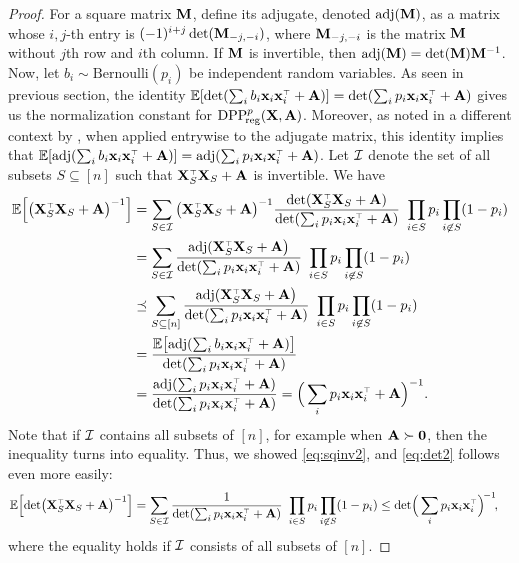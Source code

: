 \documentclass[thesis.tex]{subfiles}
\begin{document}
\begin{proof}
For a square matrix $\mathbf M$, define its adjugate, denoted $\operatorname{\textnormal{adj}}(\mathbf M)$, as a matrix
whose $i,j$-th entry is $(-1)^{i+j}\det(\mathbf M_{-j,-i})$, where
$\mathbf M_{-j,-i}$ is the matrix $\mathbf M$ without $j$th row and $i$th column. If
$\mathbf M$ is invertible, then $\operatorname{\textnormal{adj}}(\mathbf M) = \det(\mathbf M)\mathbf M^{-1}$. Now, let
$b_i\sim\mathrm{Bernoulli}(p_i)$ be independent random variables. As seen
in previous section, the identity
$\E[\det(\sum_ib_i\x_i\x_i^\top+\A)]=\det(\sum_ip_i\x_i\x_i^\top+\A)$ gives
us the normalization constant for ${{\mathrm{DPP}}_{\!\mathrm{reg}}^{p}}(\mathbf X,\mathbf A)$. Moreover, as
noted in a different context by \cite{determinantal-averaging}, when
applied entrywise to the adjugate matrix, this identity implies that
$\E[\adj(\sum_ib_i\x_i\x_i^\top+\A)]=\adj(\sum_ip_i\x_i\x_i^\top+\A)$. Let
$\mathcal I$ denote the set of all subsets $S\subseteq [n]$ such that
$\X_S^\top\X_S+\A$ is invertible. We have
\begin{align*}
  \E\Big[\big(\X_S^\top\X_S+\A\big)^{-1}\Big]
  &= \sum_{S\in\Ic}\big(\X_S^\top\X_S+\A\big)^{-1}
\frac{\det(\X_S^\top\X_S+\A)}{\det(\sum_ip_i\x_i\x_i^\top+\A)}\ \prod_{i\in
    S}p_i\prod_{i\not\in S}(1-p_i)
\\ &=\sum_{S\in\Ic}\frac{\adj(\X_S^\top\X_S+\A\big)}
{\det(\sum_ip_i\x_i\x_i^\top+\A)}\ \prod_{i\in
     S}p_i\prod_{i\not\in S}(1-p_i)
\\ &\preceq \sum_{S\subseteq[n]}\frac{\adj(\X_S^\top\X_S+\A\big)}
{\det(\sum_ip_i\x_i\x_i^\top+\A)}\ \prod_{i\in
     S}p_i\prod_{i\not\in S}(1-p_i)
\\ &=\frac{\E\big[\!\adj(\sum_i
     b_i\x_i\x_i^\top+\A)\big]}{\det(\sum_ip_i\x_i\x_i^\top+\A)}
  \\
  &=\frac{\adj(\sum_ip_i\x_i\x_i^\top+\A)}{\det(\sum_ip_i\x_i\x_i^\top+\A)}
    = \Big(\sum_ip_i\x_i\x_i^\top+\A\Big)^{-1}.
\end{align*}
Note that if $\mathcal I$ contains all subsets of $[n]$, for example when
$\mathbf A\succ\mathbf 0$, then the inequality turns into equality. Thus, we
showed \eqref{eq:sqinv2}, and \eqref{eq:det2} follows even more easily:
\begin{align*}
  \E\Big[\!\det\!\big(\X_S^\top\X_S+\A\big)^{-1}\Big]
  &= \sum_{S\in\Ic}
\frac{1}{\det(\sum_ip_i\x_i\x_i^\top+\A)}\ \prod_{i\in
    S}p_i\prod_{i\not\in S}(1-p_i)
\leq \det\!\Big(\sum_i p_i\x_i\x_i^\top\Big)^{\!-1}\!,
\end{align*}
where the equality holds if $\mathcal I$ consists of all subsets of $[n]$.
\end{proof}
\end{document}
